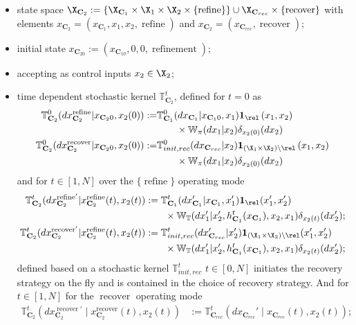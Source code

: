 \documentclass[letterpaper, 10 pt, conference]{amsart}
\theoremstyle{definition}
\theoremstyle{example}
\theoremstyle{remark}
\newcommand{\C}{{\mathbf{C}}}
\newcommand{\Wt}{\mathbb{W}_{\mathbb{T}}}
\begin{document}
\begin{itemize}
\item state space $\X_{\C_2}:=\{\X_{\C_1}\times \X_1\times \X_2\times \{\operatorname{refine}\}\}\cup \X_{\C_{rec}}\times \{\operatorname{recover}\} $ with elements $x_{\C_2}=(x_{\C_1}, x_1,x_2, \operatorname{refine})$ and $x_{\C_2}=(x_{\C_{rec}}, \operatorname{recover})$; 
\item initial state $x_{\C_20}:=(x_{\C_10},0,0,\operatorname{refinement})$;
 \item  accepting as control inputs $x_2\in\X_2$;
\item time dependent stochastic kernel $\mathbb T^t_{\C_2}$, defined for $t=0$ as
\begin{align*}
\mathbb T^0_{\C_2} (dx_{\C_2}^{\operatorname{refine}}{\mid}x_{\C_20},x_2(0) ):=&\mathbb T_{\C_1}^0 (dx_{\C_1}{\mid}x_{\C_10},x_1)\mathbf 1_{\rel}\left(x_1,x_2\right)\\&\qquad\times \mathbb W_\pi(dx_1 {\mid} x_2 )\delta_{x_2(0)}(dx_2)\\
\mathbb T^0_{\C_2} (dx_{\C_2}^{\operatorname{recover}}{\mid}x_{\C_20},x_2(0) ):=&\mathbb T^0_{init,rec} (dx_{\C_{rec}}{\mid}x_2)\mathbf 1_{(\X_1\times \X_2)\setminus\rel}\left(x_1,x_2\right)\\&\qquad\times \mathbb W_\pi(dx_1 {\mid} x_2 )\delta_{x_2(0)}(dx_2)
\end{align*}
and for $t\in[1,N]$ over the $\{\operatorname{refine}\}$ operating mode 
\begin{align*}
\mathbb T^t_{\C_2} (dx_{\C_2}^{\operatorname{refine}'}{\mid}x_{\C_2}^{\operatorname{refine}}(t),x_2(t) )&:=\mathbb T^t_{\C_1} (dx_{\C_1}'{\mid}x_{\C_1},x_1')\mathbf 1_{\rel}(x_1',x_2')\\ &\qquad\times
\Wt(d x_1' {\mid} x_2',h_{\C_1}^t(x_{\C_1}),x_2, x_1)\delta_{x_2(t)}(dx'_2);\\
\mathbb T^t_{\C_2} (dx_{\C_2}^{\operatorname{recover}'}{\mid}x_{\C_2}^{\operatorname{refine}}(t),x_2(t) )&:=\mathbb T^t_{init,rec}(dx_{\C_{rec}}'{\mid}x_2')\mathbf 1_{(\X_1\times \X_2)\setminus\rel}(x_1',x_2')\\ &\qquad\times
\Wt(d x_1' {\mid} x_2',h_{\C_1}^t(x_{\C_1}),x_2, x_1)\delta_{x_2(t)}(dx'_2);
\end{align*}
defined based on a  stochastic kernel $\mathbb T^t_{init,rec}$  $t\in[0,N]$ initiates the recovery strategy on the fly and is contained in the choice of recovery strategy. 
And for $t\in[1,N]$ for the $\operatorname{recover}$ operating mode 
\begin{align*}
\mathbb T^t_{\C_2} (dx_{\C_2}^{\operatorname{recover}'}{\mid}x_{\C_2}^{\operatorname{recover}}(t),x_2(t) )&:=\mathbb T^t_{\C_{rec}} (dx_{\C_{rec}}'{\mid}x_{\C_{rec}}(t),x_2(t) );
\end{align*}



\end{itemize}
\end{document}
